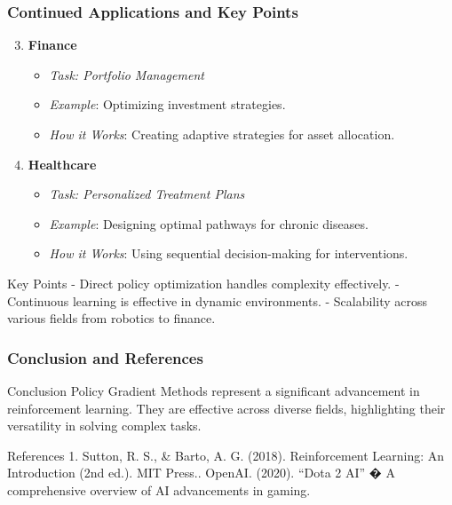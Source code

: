 \documentclass[aspectratio=169]{beamer}
\begin{document}
\begin{frame}[fragile]
    \frametitle{Continued Applications and Key Points}
    \begin{enumerate}
        \setcounter{enumi}{2} %
        \item \textbf{Finance}
            \begin{itemize}
                \item \textit{Task: Portfolio Management}
                \item \textit{Example}: Optimizing investment strategies.
                \item \textit{How it Works}: Creating adaptive strategies for asset allocation.
            \end{itemize}

        \item \textbf{Healthcare}
            \begin{itemize}
                \item \textit{Task: Personalized Treatment Plans}
                \item \textit{Example}: Designing optimal pathways for chronic diseases.
                \item \textit{How it Works}: Using sequential decision-making for interventions.
            \end{itemize}
    \end{enumerate}
    
    \begin{block}{Key Points}
        - Direct policy optimization handles complexity effectively.\newline
        - Continuous learning is effective in dynamic environments.\newline
        - Scalability across various fields from robotics to finance.
    \end{block}
\end{frame}

\begin{frame}[fragile]
    \frametitle{Conclusion and References}
    \begin{block}{Conclusion}
        Policy Gradient Methods represent a significant advancement in reinforcement learning.\newline
        They are effective across diverse fields, highlighting their versatility in solving complex tasks.
    \end{block}
    
    \begin{block}{References}
        1. Sutton, R. S., \& Barto, A. G. (2018). Reinforcement Learning: An Introduction (2nd ed.). MIT Press.. OpenAI. (2020). ``Dota 2 AI'' � A comprehensive overview of AI advancements in gaming.
    \end{block}
\end{frame}
\end{document}
